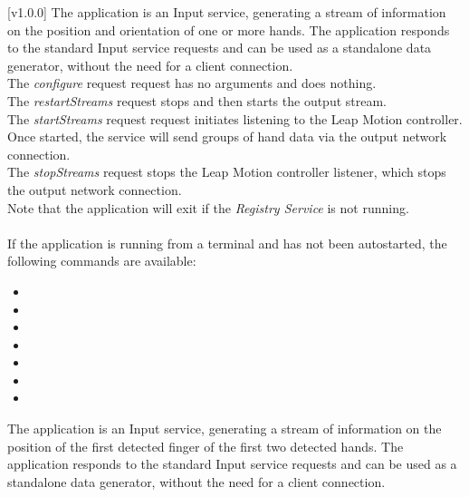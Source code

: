 [v1.0.0]
The  application is an Input service,
generating a stream of information on the position and orientation of one or more hands.
The application responds to the standard Input service requests and can be used as a
standalone data generator, without the need for a client connection.\\

The \emph{configure} request request has no arguments and does nothing.\\

The \emph{restartStreams} request stops and then starts the output stream.\\

The \emph{startStreams} request request initiates listening to the Leap Motion controller.
Once started, the service will send groups of hand data via the output \yarp{} network
connection.\\

The \emph{stopStreams} request stops the Leap Motion controller listener, which stops the
output \yarp{} network connection.\\ 

Note that the application will exit if the \emph{Registry Service} is not running.\\

\insertAppParameters{}
\insertTagDescription{\LMI}
\insertInputServiceComment{}\\

If the application is running from a terminal and has not been autostarted, the following
commands are available:
\begin{itemize}
\item{}
\item\exSp{}
\item\exSp{}
\item\exSp{}
\item\exSp{}
\item\exSp{}
\item\exSp{}
\end{itemize}
\primaryEnd{}
The  application is an Input service,
generating a stream of information on the position of the first detected finger of the
first two detected hands.
The application responds to the standard Input service requests and can be used as a
standalone data generator, without the need for a client connection.\\

